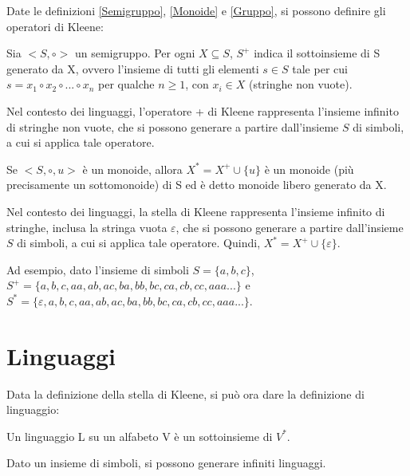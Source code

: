   Date le definizioni \ref{Semigruppo}, \ref{Monoide} e \ref{Gruppo}, si possono definire gli operatori di Kleene:

  \begin{definition} 
    Sia \(<S, \circ>\) un semigruppo. Per ogni \(X\subseteq S\), \(S^+\) indica il sottoinsieme di S generato da X, ovvero l'insieme di tutti gli elementi \(s\in S\) tale per cui \(s=x_1\circ x_2\circ...\circ x_n\) per qualche \(n\geq 1\), con \(x_i\in X\) (stringhe non vuote).
  \end{definition}

  Nel contesto dei linguaggi, l'operatore + di Kleene rappresenta l'insieme infinito di stringhe non vuote, che si possono generare a partire dall'insieme \(S\) di simboli, a cui si applica tale operatore.

  \begin{definition} 
    Se \(<S, \circ, u>\) è un monoide, allora \(X^*=X^+\cup\{u\}\) è un monoide (più precisamente un sottomonoide) di S ed è detto monoide libero generato da X.
  \end{definition} 

  Nel contesto dei linguaggi, la stella di Kleene rappresenta l'insieme infinito di stringhe, inclusa la stringa vuota \(\varepsilon\), che si possono generare a partire dall'insieme \(S\) di simboli, a cui si applica tale operatore. Quindi, \(X^*=X^+\cup \{\varepsilon\}\).

  Ad esempio, dato l'insieme di simboli \(S=\{a,b,c\}\), \(S^+=\{a,b,c,aa,ab,ac,ba,bb,bc,ca,cb,cc,aaa...\}\) e \(S^*=\{\varepsilon,a,b,c,aa,ab,ac,ba,bb,bc,ca,cb,cc,aaa...\}\). 

  \section{Linguaggi} 
  Data la definizione della stella di Kleene, si può ora dare la definizione di linguaggio:
  \begin{definition} [Linguaggio]
    Un linguaggio L su un alfabeto V è un sottoinsieme di \(V^*\).
  \end{definition}
  Dato un insieme di simboli, si possono generare infiniti linguaggi.
  
  \vspace{10pt}

